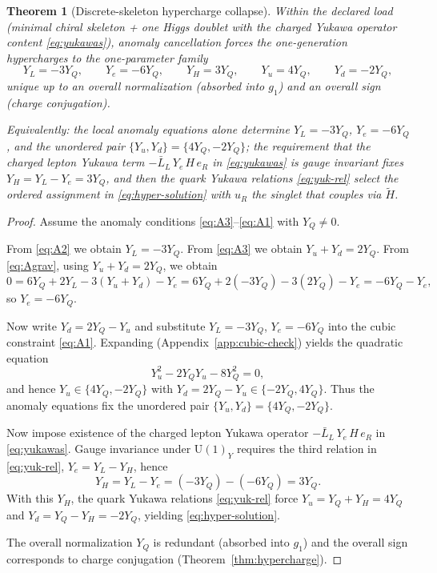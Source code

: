 \documentclass[11pt]{article}
\newtheorem{theorem}[definition]{Theorem}
\theoremstyle{remark}
\newcommand{\U}{\ensuremath{\mathrm{U}}}
\begin{document}
\begin{theorem}[Discrete-skeleton hypercharge collapse]\label{thm:anomaly-yukawa}
Within the declared load (minimal chiral skeleton + one Higgs doublet with the charged Yukawa operator content
\eqref{eq:yukawas}), anomaly cancellation forces the one-generation hypercharges to the one-parameter family
\begin{equation}\label{eq:hyper-solution}
Y_L=-3Y_Q,\qquad
Y_e=-6Y_Q,\qquad
Y_H=3Y_Q,\qquad
Y_u=4Y_Q,\qquad
Y_d=-2Y_Q,
\end{equation}
unique up to an overall normalization (absorbed into $g_1$) and an overall sign (charge conjugation).

Equivalently: the local anomaly equations alone determine $Y_L=-3Y_Q$, $Y_e=-6Y_Q$, and the unordered pair
$\{Y_u,Y_d\}=\{4Y_Q,-2Y_Q\}$; the requirement that the charged lepton Yukawa term
$-\bar L_L\,Y_e\,H\,e_R$ in \eqref{eq:yukawas} is gauge invariant fixes $Y_H=Y_L-Y_e=3Y_Q$, and then the quark Yukawa
relations \eqref{eq:yuk-rel} select the ordered assignment in \eqref{eq:hyper-solution} with $u_R$ the singlet that
couples via $\tilde H$.
\end{theorem}

\begin{proof}
Assume the anomaly conditions \eqref{eq:A3}--\eqref{eq:A1} with $Y_Q\neq 0$.

From \eqref{eq:A2} we obtain $Y_L=-3Y_Q$.
From \eqref{eq:A3} we obtain $Y_u+Y_d=2Y_Q$.
From \eqref{eq:Agrav}, using $Y_u+Y_d=2Y_Q$, we obtain
\[
0=6Y_Q+2Y_L-3(Y_u+Y_d)-Y_e
=6Y_Q+2(-3Y_Q)-3(2Y_Q)-Y_e
=-6Y_Q-Y_e,
\]
so $Y_e=-6Y_Q$.

Now write $Y_d=2Y_Q-Y_u$ and substitute $Y_L=-3Y_Q$, $Y_e=-6Y_Q$ into the cubic constraint \eqref{eq:A1}.
Expanding (Appendix~\ref{app:cubic-check}) yields the quadratic equation
\begin{equation}\label{eq:Yu-quad}
Y_u^2-2Y_QY_u-8Y_Q^2=0,
\end{equation}
and hence $Y_u\in\{4Y_Q,-2Y_Q\}$ with $Y_d=2Y_Q-Y_u\in\{-2Y_Q,4Y_Q\}$.
Thus the anomaly equations fix the unordered pair $\{Y_u,Y_d\}=\{4Y_Q,-2Y_Q\}$.

Now impose existence of the charged lepton Yukawa operator $-\bar L_L\,Y_e\,H\,e_R$ in \eqref{eq:yukawas}.
Gauge invariance under $\U(1)_Y$ requires the third relation in \eqref{eq:yuk-rel}, $Y_e=Y_L-Y_H$, hence
\begin{equation}\label{eq:YH-from-anom}
Y_H = Y_L-Y_e = (-3Y_Q)-(-6Y_Q)=3Y_Q.
\end{equation}
With this $Y_H$, the quark Yukawa relations \eqref{eq:yuk-rel} force
$Y_u=Y_Q+Y_H=4Y_Q$ and $Y_d=Y_Q-Y_H=-2Y_Q$, yielding \eqref{eq:hyper-solution}.

The overall normalization $Y_Q$ is redundant (absorbed into $g_1$) and the overall sign corresponds to charge
conjugation (Theorem~\ref{thm:hypercharge}).
\end{proof}
\end{document}
